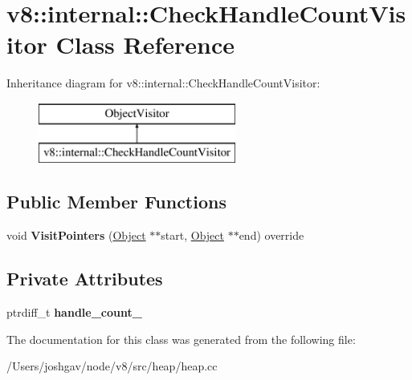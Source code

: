 \hypertarget{classv8_1_1internal_1_1_check_handle_count_visitor}{}\section{v8\+:\+:internal\+:\+:Check\+Handle\+Count\+Visitor Class Reference}
\label{classv8_1_1internal_1_1_check_handle_count_visitor}
Inheritance diagram for v8\+:\+:internal\+:\+:Check\+Handle\+Count\+Visitor\+:\begin{figure}[H]
\begin{center}
\leavevmode
\includegraphics[height=2.000000cm]{classv8_1_1internal_1_1_check_handle_count_visitor}
\end{center}
\end{figure}
\subsection*{Public Member Functions}
\begin{DoxyCompactItemize}
\item 
void {\bfseries Visit\+Pointers} (\hyperlink{classv8_1_1internal_1_1_object}{Object} $\ast$$\ast$start, \hyperlink{classv8_1_1internal_1_1_object}{Object} $\ast$$\ast$end) override\hypertarget{classv8_1_1internal_1_1_check_handle_count_visitor_a7e981990f1a54bb5f7d2f563c2e3b27b}{}\label{classv8_1_1internal_1_1_check_handle_count_visitor_a7e981990f1a54bb5f7d2f563c2e3b27b}

\end{DoxyCompactItemize}
\subsection*{Private Attributes}
\begin{DoxyCompactItemize}
\item 
ptrdiff\+\_\+t {\bfseries handle\+\_\+count\+\_\+}\hypertarget{classv8_1_1internal_1_1_check_handle_count_visitor_a5d85904115b2f5dcae5925b6b438109a}{}\label{classv8_1_1internal_1_1_check_handle_count_visitor_a5d85904115b2f5dcae5925b6b438109a}

\end{DoxyCompactItemize}


The documentation for this class was generated from the following file\+:\begin{DoxyCompactItemize}
\item 
/\+Users/joshgav/node/v8/src/heap/heap.\+cc\end{DoxyCompactItemize}
